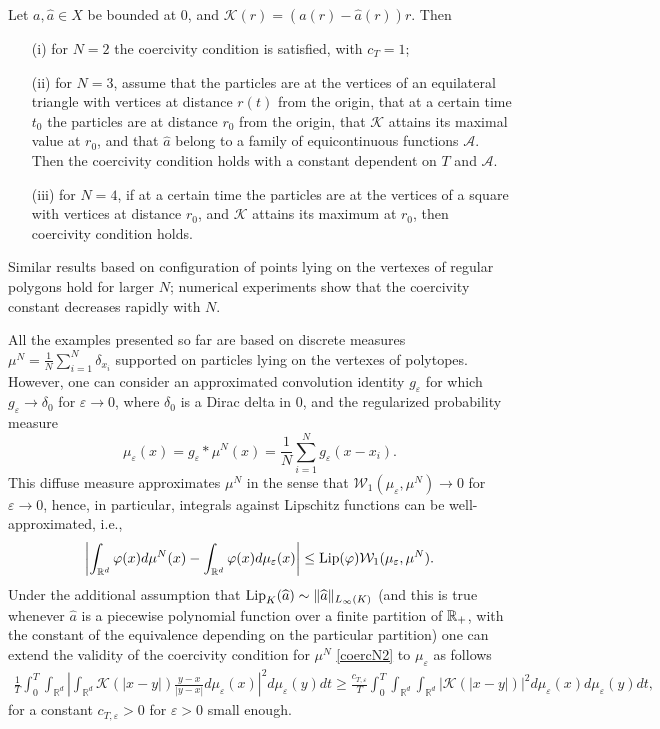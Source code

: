 \begin{proposition}
Let {$a, \widehat a \in X$} be bounded at $0$, and $\mathcal K(r) = (a(r) - \widehat a(r)) r$.
Then
\begin{itemize}
\item[(i)] for $N=2$ the coercivity condition is satisfied, with $c_T=1$;
\item[(ii)] for $N=3$, assume that the particles are at the vertices of an equilateral triangle with vertices at distance $r(t)$ from the origin, that at a certain time $t_0$ the particles are  at distance $r_0$ from the origin, that $\mathcal{K}$ attains its maximal value at $r_0$, and that $\hat a$ belong to a family of equicontinuous functions $\mathcal{A}$. Then the coercivity condition holds with a constant dependent on $T$ and $\mathcal{A}$.
\item[(iii)] for $N=4$, if at a certain time the particles are at the vertices of a square with vertices at distance $r_0$, and $\mathcal K$ attains its maximum at $r_0$, then coercivity condition holds.
\end{itemize}
\label{p:disccoerc}
\end{proposition}
Similar results {based on configuration of points lying on the vertexes of regular polygons} hold for larger $N$; numerical experiments show that the coercivity constant decreases rapidly with $N$.

All the examples presented so far are based on discrete measures $\mu^N=\frac{1}{N} \sum_{i=1}^N\delta_{x_i}$ supported on particles lying on the vertexes of polytopes. However, one can consider an approximated convolution identity $g_\varepsilon$ for which $g_\varepsilon \to \delta_0$ for $\varepsilon \to 0$, where $\delta_0$ is a Dirac delta in $0$, and  the regularized probability measure
$$
\mu_\varepsilon(x) = g_\varepsilon * \mu^N (x)= \frac{1}{N} \sum_{i=1}^N g_\varepsilon (x-x_i).
$$
This diffuse measure approximates $\mu^N$ in the sense that $\mathcal W_1(\mu_\varepsilon,\mu^N) \to 0$ for $\varepsilon \to 0$, hence, in particular, integrals against Lipschitz functions can be well-approximated, i.e.,
$$
\left | \int_{\mathbb R^d} \varphi(x) d \mu^N(x) -\int_{\mathbb R^d}  \varphi(x) d \mu_\varepsilon(x) \right | \leq \textup{Lip}(\varphi) \mathcal W_1(\mu_\varepsilon,\mu^N) .
$$
Under the additional assumption that $\textup{Lip}_K(\widehat a) \sim \| \widehat a \|_{L_\infty(K)}$ (and this is true whenever $\widehat a$ is a piecewise polynomial function over a finite partition of $\mathbb{R}_+$, with the constant of the equivalence depending on the particular partition) one can extend the validity of the coercivity condition for $\mu^N$ \eqref{coercN2} 
to $\mu_\varepsilon$ as follows
\begin{align*}
\frac{1}{T} \int_0^T \!\!\int_{\mathbb R^d} \!\! \left | \int_{\mathbb R^d}\!\!  \mathcal K(|x-y|) \frac{y-x}{|y-x|} d \mu_\varepsilon(x) \right |^2\!\!\! d\mu_\varepsilon(y) dt\!
\geq  \frac{c_{T,\varepsilon }}{T} \!\!\int_0^T \!\! \int_{\mathbb R^d} \!\! \int_{\mathbb R^d}\!\!  |\mathcal K(|x-y|)|^2\! d\mu_\varepsilon(x) d\mu_\varepsilon(y)dt,
\end{align*}
for a constant $c_{T,\varepsilon }>0$ for $\varepsilon>0$ small enough.
\\

